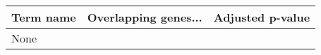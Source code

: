 \begin{tabular}{lll}
\toprule
Term name & Overlapping genes... & Adjusted p-value \\
\midrule
     None &                      &                  \\
\bottomrule
\end{tabular}

